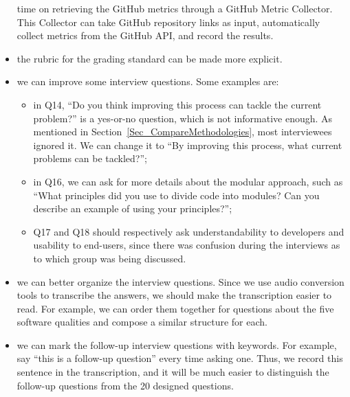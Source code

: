 \documentclass[final, 3p, times, authoryear]{elsarticle}
\begin{document}
\begin{itemize}
	time on retrieving the GitHub metrics through a GitHub Metric Collector.
	This Collector can take GitHub repository links as input, automatically
	collect metrics from the GitHub API, and record the results.
	\item the rubric for the grading standard can be made more explicit.
	\item we can improve some interview questions. Some examples are:
	\begin{itemize}
	    \item in {Q14}, ``Do you think improving this process can tackle the
	    current problem?'' is a yes-or-no question, which is not informative
	    enough. As mentioned in Section~\ref{Sec_CompareMethodologies}, most
	    interviewees ignored it. We can change it to ``By improving this
	    process, what current problems can be tackled?''; 
	    \item in {Q16}, we can ask for more details about the modular
	    approach, such as ``What principles did you use to divide code into
	    modules? Can you describe an example of using your principles?'';
	    \item {Q17} and {Q18} should respectively ask understandability to
	    developers and usability to end-users, since there was confusion during
	    the interviews as to which group was being discussed.
	\end{itemize}
	\item we can better organize the interview questions. Since we use audio
	conversion tools to transcribe the answers, we should make the transcription
	easier to read. For example, we can order them together for questions about
	the five software qualities and compose a similar structure for each.
	\item we can mark the follow-up interview questions with keywords. For
	example, say ``this is a follow-up question'' every time asking one. Thus, we
	record this sentence in the transcription, and it will be much easier to
	distinguish the follow-up questions from the 20 designed questions.
\end{itemize}



\end{document}
